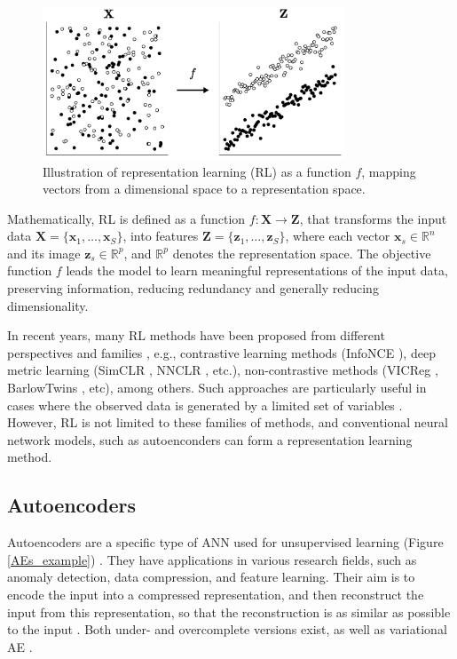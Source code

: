 \documentclass[journal,article,submit,pdftex,moreauthors]{Definitions/mdpi}
\begin{document}
\begin{figure}[H]
	\centering
	\includegraphics[width=9cm]{figures/representation_learning.pdf}
	 \caption{Illustration of representation learning (RL) as a function $f$, mapping vectors from a dimensional space to a representation space.}
	\label{}      
	\centering
\end{figure}

Mathematically, \ac{RL} is defined as a function $f : \mathbf{X} \to \mathbf{Z}$, that transforms the input data $\mathbf{X} = \{\mathbf{x}_1, \dots, \mathbf{x}_S\}$, into features $\mathbf{Z} = \{\mathbf{z}_1, \dots, \mathbf{z}_S\}$, where each vector $\mathbf{x}_s \in \mathbb{R}^n$ and its image $\mathbf{z}_s \in \mathbb{R}^p$, and $\mathbb{R}^p$ denotes the representation space.
The objective function $f$ leads the model to learn meaningful representations of the input data, preserving information, reducing redundancy and generally reducing dimensionality.

In recent years, many \ac{RL} methods have been proposed from different perspectives and families \cite{Balestriero2023}, 
e.g., contrastive learning methods (InfoNCE \cite{Tschannen2019,LeKhac2020,Aitchison2021}), deep metric learning (SimCLR \cite{Chen2020,Bachman2019}, NNCLR \cite{Dwibedi2021}, etc.), non-contrastive methods (VICReg \cite{Bardes2021}, BarlowTwins \cite{Zbontar2021,Lisaius2024}, etc), among others.
Such approaches are particularly useful in cases where the observed data is generated by a limited set of variables \cite{Coifman2006}. 
However, \ac{RL} is not limited to these families of methods, and conventional neural network models, such as autoenconders can form a representation learning method.

\subsection{Autoencoders}\label{aes}
Autoencoders are a specific type of ANN used for unsupervised learning (Figure \ref{AEs_example}) \cite{Bank2020, Bank2023}. They have applications in various research fields, such as anomaly detection, data compression, and feature learning. Their aim is to encode the input into a compressed representation, and then reconstruct the input from this representation, so that the reconstruction is as similar as possible to the input \cite{Tzelepi2022,Zhang2019}. 
Both under- and overcomplete versions exist, as well as variational AE \cite{Valero2021}. 
\end{document}
